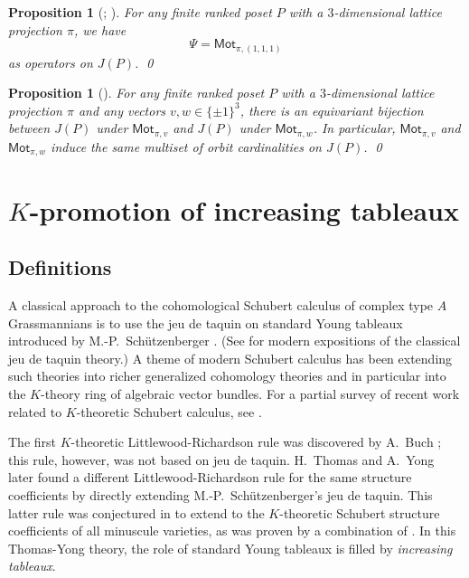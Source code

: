\documentclass[12pt]{amsart}
\newtheorem{proposition}[theorem]{Proposition}
\theoremstyle{definition}
\theoremstyle{remark}
\numberwithin{equation}{section}
\newcommand{\mot}{\ensuremath{\mathsf{Mot}}}
\begin{document}
\begin{proposition}[{\cite[Lemma~1]{Cameron.Fonderflaass}}; {\cite[Proposition~3.18]{DPS}}]
\label{prop:psi_is_toggle}
For any finite ranked poset $P$ with a $3$-dimensional lattice projection $\pi$, we have 
\[
 \Psi  = \mot_{\pi, (1,1,1)}  \] 
 as operators on $J(P)$. \qed
\end{proposition}

\begin{proposition}[{\cite[Theorem~3.25]{DPS}}]
\label{prop:conjugate_actions}
For any finite ranked poset $P$ with a $3$-dimensional lattice projection $\pi$ and any vectors $v,w \in \{ \pm 1 \}^3$, there is an equivariant bijection between $J(P)$ under $\mot_{\pi, v}$ and $J(P)$ under $\mot_{\pi,w}$. In particular, $\mot_{\pi, v}$ and $\mot_{\pi,w}$ induce the same multiset of orbit cardinalities on $J(P)$. \qed
\end{proposition}

\section{$K$-promotion of increasing tableaux}\label{sec:Kpromotion}

\subsection{Definitions}\label{sec:Kpro_defs}
A classical approach to the cohomological Schubert calculus of complex type $A$ Grassmannians is to use the jeu de taquin on standard Young tableaux introduced by M.-P.~Sch\"utzenberger \cite{Schutzenberger:jdt}. (See \cite{Fulton, Manivel} for modern expositions of the classical jeu de taquin theory.) A theme of modern Schubert calculus has been extending such theories into richer generalized cohomology theories and in particular into the $K$-theory ring of algebraic vector bundles. For a partial survey of recent work related to $K$-theoretic Schubert calculus, see \cite{Pechenik.Yong:genomic}.

The first $K$-theoretic Littlewood-Richardson rule was discovered by A.~Buch \cite{Buch}; this rule, however, was not based on jeu de taquin. H.~Thomas and A.~Yong \cite{Thomas.Yong:K} later found a different Littlewood-Richardson rule for the same structure coefficients by directly extending M.-P.~Sch\"utzenberger's jeu de taquin. This latter rule was conjectured in \cite{Thomas.Yong:K} to extend to the $K$-theoretic Schubert structure coefficients of all minuscule varieties, as was proven by a combination of \cite{Buch.Ravikumar,Clifford.Thomas.Yong,Buch.Samuel}. In this Thomas-Yong theory, the role of standard Young tableaux is filled by \emph{increasing tableaux}.
\end{document}

